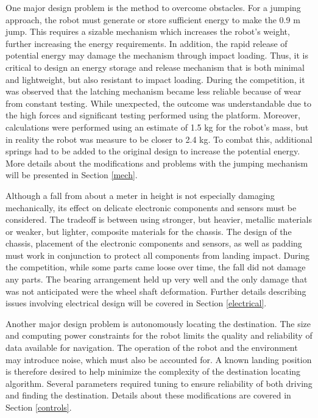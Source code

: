 \documentclass[ece]{uw-wkrpt}
\begin{document}
One major design problem is the method to overcome obstacles. For a jumping approach, the robot must generate or store sufficient energy to make the 0.9 m jump. This requires a sizable mechanism which increases the robot’s weight, further increasing the energy requirements. In addition, the rapid release of potential energy may damage the mechanism through impact loading. Thus, it is critical to design an energy storage and release mechanism that is both minimal and lightweight, but also resistant to impact loading. During the competition, it was observed that the latching mechanism became less reliable because of wear from constant testing. While unexpected, the outcome was understandable due to the high forces and significant testing performed using the platform. Moreover, calculations were performed using an estimate of 1.5 kg for the robot's mass, but in reality the robot was measure to be closer to 2.4 kg. To combat this, additional springs had to be added to the original design to increase the potential energy. More details about the modifications and problems with the jumping mechanism will be presented in Section \ref{mech}.

Although a fall from about a meter in height is not especially damaging mechanically, its effect on delicate electronic components and sensors must be considered. The tradeoff is between using stronger, but heavier, metallic materials or weaker, but lighter, composite materials for the chassis. The design of the chassis, placement of the electronic components and sensors, as well as padding must work in conjunction to protect all components from landing impact. During the competition, while some parts came loose over time, the fall did not damage any parts. The bearing arrangement held up very well and the only damage that was not anticipated were the wheel shaft deformation. Further details describing issues involving electrical design will be covered in Section \ref{electrical}.

Another major design problem is autonomously locating the destination. The size and computing power constraints for the robot limits the quality and reliability of data available for navigation. The operation of the robot and the environment may introduce noise, which must also be accounted for. A known landing position is therefore desired to help minimize the complexity of the destination locating algorithm. Several parameters required tuning to ensure reliability of both driving and finding the destination. Details about these modifications are covered in Section \ref{controls}. 
\end{document}
